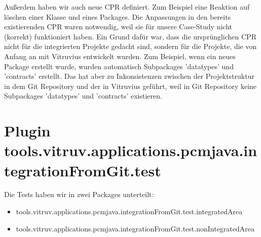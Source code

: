 Außerdem haben wir auch neue CPR definiert. Zum Beispiel eine Reaktion auf löschen einer Klasse und eines Packages. Die Anpassungen in den bereits existierenden CPR waren notwendig, weil sie für unsere Case-Study nicht (korrekt) funktioniert haben. Ein Grund dafür war, dass die ursprünglichen CPR nicht für die integrierten Projekte gedacht sind, sondern für die Projekte, die von Anfang an mit Vitruvius entwickelt wurden. Zum Beispiel, wenn ein neues Package erstellt wurde, wurden automatisch  Subpackages 'datatypes' und 'contracts' erstellt. Das hat aber zu Inkonsistenzen zwischen der Projektstruktur in dem Git Repository und der in Vitruvius geführt, weil in Git Repository keine Subpackages 'datatypes' und 'contracts' existieren.

\section{Plugin tools.vitruv.applications.pcmjava.integrationFromGit.test}

Die Tests haben wir in zwei Packages unterteilt:

\begin{itemize}
\item tools.vitruv.applications.pcmjava.integrationFromGit.test.integratedArea
\item tools.vitruv.applications.pcmjava.integrationFromGit.test.nonIntegratedArea
\end{itemize}

